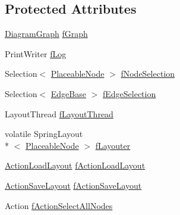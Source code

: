 \subsection*{Protected Attributes}
\begin{DoxyCompactItemize}
\item 
\hyperlink{classorg_1_1tzi_1_1use_1_1gui_1_1views_1_1diagrams_1_1_diagram_graph}{Diagram\-Graph} \hyperlink{classorg_1_1tzi_1_1use_1_1gui_1_1views_1_1diagrams_1_1_diagram_view_ad51196cb0d6dbed13e117f00464ba0dc}{f\-Graph}
\item 
Print\-Writer \hyperlink{classorg_1_1tzi_1_1use_1_1gui_1_1views_1_1diagrams_1_1_diagram_view_a312a1e5955d507f8862458b3ef66652f}{f\-Log}
\item 
Selection$<$ \hyperlink{classorg_1_1tzi_1_1use_1_1gui_1_1views_1_1diagrams_1_1elements_1_1_placeable_node}{Placeable\-Node} $>$ \hyperlink{classorg_1_1tzi_1_1use_1_1gui_1_1views_1_1diagrams_1_1_diagram_view_ab47a796f48a800e68c60fbd0846796e7}{f\-Node\-Selection}
\item 
Selection$<$ \hyperlink{classorg_1_1tzi_1_1use_1_1gui_1_1views_1_1diagrams_1_1elements_1_1edges_1_1_edge_base}{Edge\-Base} $>$ \hyperlink{classorg_1_1tzi_1_1use_1_1gui_1_1views_1_1diagrams_1_1_diagram_view_a68e254ef6ed3b00997cf7ff42867cf5b}{f\-Edge\-Selection}
\item 
Layout\-Thread \hyperlink{classorg_1_1tzi_1_1use_1_1gui_1_1views_1_1diagrams_1_1_diagram_view_aab5d34422e54c95bcb73d6a0df6da610}{f\-Layout\-Thread}
\item 
volatile Spring\-Layout\\*
$<$ \hyperlink{classorg_1_1tzi_1_1use_1_1gui_1_1views_1_1diagrams_1_1elements_1_1_placeable_node}{Placeable\-Node} $>$ \hyperlink{classorg_1_1tzi_1_1use_1_1gui_1_1views_1_1diagrams_1_1_diagram_view_ae8a066af026f76702fa68173e0aa5180}{f\-Layouter}
\item 
\hyperlink{classorg_1_1tzi_1_1use_1_1gui_1_1views_1_1diagrams_1_1event_1_1_action_load_layout}{Action\-Load\-Layout} \hyperlink{classorg_1_1tzi_1_1use_1_1gui_1_1views_1_1diagrams_1_1_diagram_view_a8ea6ba1f579b25b50c5a07833b50848c}{f\-Action\-Load\-Layout}
\item 
\hyperlink{classorg_1_1tzi_1_1use_1_1gui_1_1views_1_1diagrams_1_1event_1_1_action_save_layout}{Action\-Save\-Layout} \hyperlink{classorg_1_1tzi_1_1use_1_1gui_1_1views_1_1diagrams_1_1_diagram_view_aa295396a798f103dbbce68dd30584b8f}{f\-Action\-Save\-Layout}
\item 
Action \hyperlink{classorg_1_1tzi_1_1use_1_1gui_1_1views_1_1diagrams_1_1_diagram_view_a7864c12385df2c748cb892499f8cc086}{f\-Action\-Select\-All\-Nodes}

\end{DoxyCompactItemize}
